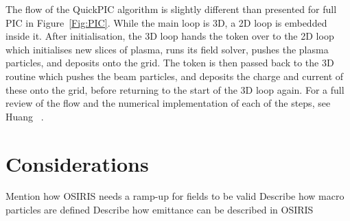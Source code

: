 The flow of the QuickPIC algorithm is slightly different than presented for full PIC in Figure~\ref{Fig:PIC}.
While the main loop is 3D, a 2D loop is embedded inside it.
After initialisation, the 3D loop hands the token over to the 2D loop which initialises new slices of plasma, runs its field solver, pushes the plasma particles, and deposits onto the grid.
The token is then passed back to the 3D routine which pushes the beam particles, and deposits the charge and current of these onto the grid, before returning to the start of the 3D loop again.
For a full review of the flow and the numerical implementation of each of the steps, see Huang \etal~\cite{huang:2006}.

\section{Considerations}
\label{PIC:Full}

Mention how OSIRIS needs a ramp-up for fields to be valid
Describe how macro particles are defined
Describe how emittance can be described in OSIRIS
